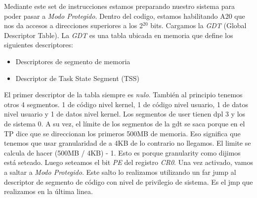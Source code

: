 Mediante este set de instrucciones estamos preparando nuestro sistema para poder pasar a \textit{Modo Protegido}.
Dentro del codigo, estamos habilitando A20 que nos da accesos a direcciones superiores a los 2$^{20}$ bits.\newline
Cargamos la \textit{GDT} (Global Descriptor Table).
La \textit{GDT} es una tabla ubicada en memoria que define los siguientes descriptores:
\begin{itemize}
    \item Descriptores de segmento de memoria
    \item Descriptor de Task State Segment (TSS)
\end{itemize}
El primer descriptor de la tabla siempre es \textit{nulo}. También al principio tenemos otros 4 segmentos. 1 de código nivel kernel, 1 de código nivel usuario, 1 de datos nivel usuario y 1 de datos nivel kernel. Los segmentos de user tienen dpl 3 y los de sistema 0. A su vez, el límite de los segmentos de la gdt se saca porque en el TP dice que se direccionan los primeros 500MB de memoria. Eso significa que tenemos que usar granularidad de a 4KB de lo contrario no llegamos. El limite se calcula de hacer (500MB / 4KB) - 1. Esto es porque granularity como dijimos está seteado. Luego seteamos el bit \textit{PE} del registro \textit{CR0}.
\newline
Una vez activado, vamos a saltar a \textit{Modo Protegido}. Este salto lo realizamos utilizando un far jump al descriptor de segmento de c\'odigo con nivel de privilegio de sistema. Es el jmp que realizamos en la \'ultima linea.


